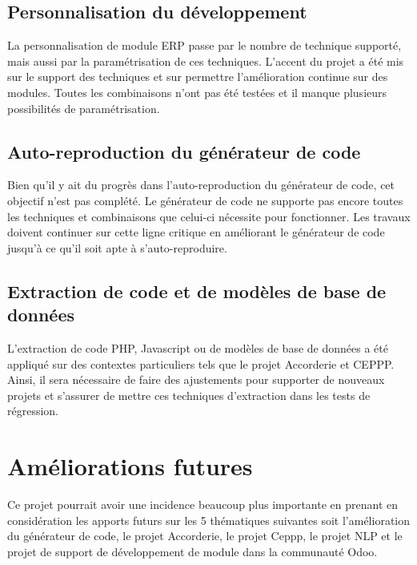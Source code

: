 \subsection{Personnalisation du développement}
La personnalisation de module ERP passe par le nombre de technique supporté, mais aussi par la paramétrisation de ces techniques. L'accent du projet a été mis sur le support des techniques et sur permettre l'amélioration continue sur des modules. Toutes les combinaisons n'ont pas été testées et il manque plusieurs possibilités de paramétrisation.

\subsection{Auto-reproduction du générateur de code}
Bien qu'il y ait du progrès dans l'auto-reproduction du générateur de code, cet objectif n'est pas complété. Le générateur de code ne supporte pas encore toutes les techniques et combinaisons que celui-ci nécessite pour fonctionner. Les travaux doivent continuer sur cette ligne critique en améliorant le générateur de code jusqu'à ce qu'il soit apte à s'auto-reproduire.

\subsection{Extraction de code et de modèles de base de données}
L'extraction de code PHP, Javascript ou de modèles de base de données a été appliqué sur des contextes particuliers tels que le projet Accorderie et CEPPP. Ainsi, il sera nécessaire de faire des ajustements pour supporter de nouveaux projets et s'assurer de mettre ces techniques d'extraction dans les tests de régression.

\section{Améliorations futures}


Ce projet pourrait avoir une incidence beaucoup plus importante en prenant en considération les apports futurs sur les 5 thématiques suivantes soit l'amélioration du générateur de code, le projet Accorderie, le projet Ceppp, le projet NLP et le projet de support de développement de module dans la communauté Odoo.

